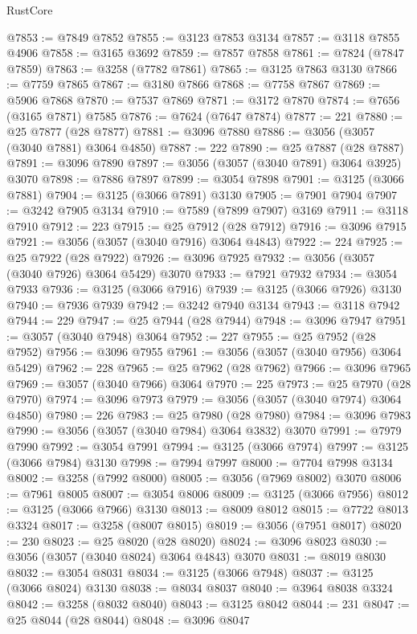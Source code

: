 \begin{lexlean}{RustCore}
\begin{coremodule}
@7853 := @7849 @7852
@7855 := @3123 @7853 @3134
@7857 := @3118 @7855 @4906
@7858 := @3165 @3692
@7859 := @7857 @7858
@7861 := @7824 (@7847 @7859)
@7863 := @3258 (@7782 @7861)
@7865 := @3125 @7863 @3130
@7866 := @7759 @7865
@7867 := @3180 @7866
@7868 := @7758 @7867
@7869 := @5906 @7868
@7870 := @7537 @7869
@7871 := @3172 @7870
@7874 := @7656 (@3165 @7871) @7585
@7876 := @7624 (@7647 @7874)
@7877 := 221
@7880 := @25 @7877 (@28 @7877)
@7881 := @3096 @7880
@7886 := @3056 (@3057 (@3040 @7881) @3064 @4850)
@7887 := 222
@7890 := @25 @7887 (@28 @7887)
@7891 := @3096 @7890
@7897 := @3056 (@3057 (@3040 @7891) @3064 @3925) @3070
@7898 := @7886 @7897
@7899 := @3054 @7898
@7901 := @3125 (@3066 @7881)
@7904 := @3125 (@3066 @7891) @3130
@7905 := @7901 @7904
@7907 := @3242 @7905 @3134
@7910 := @7589 (@7899 @7907) @3169
@7911 := @3118 @7910
@7912 := 223
@7915 := @25 @7912 (@28 @7912)
@7916 := @3096 @7915
@7921 := @3056 (@3057 (@3040 @7916) @3064 @4843)
@7922 := 224
@7925 := @25 @7922 (@28 @7922)
@7926 := @3096 @7925
@7932 := @3056 (@3057 (@3040 @7926) @3064 @5429) @3070
@7933 := @7921 @7932
@7934 := @3054 @7933
@7936 := @3125 (@3066 @7916)
@7939 := @3125 (@3066 @7926) @3130
@7940 := @7936 @7939
@7942 := @3242 @7940 @3134
@7943 := @3118 @7942
@7944 := 229
@7947 := @25 @7944 (@28 @7944)
@7948 := @3096 @7947
@7951 := @3057 (@3040 @7948) @3064
@7952 := 227
@7955 := @25 @7952 (@28 @7952)
@7956 := @3096 @7955
@7961 := @3056 (@3057 (@3040 @7956) @3064 @5429)
@7962 := 228
@7965 := @25 @7962 (@28 @7962)
@7966 := @3096 @7965
@7969 := @3057 (@3040 @7966) @3064
@7970 := 225
@7973 := @25 @7970 (@28 @7970)
@7974 := @3096 @7973
@7979 := @3056 (@3057 (@3040 @7974) @3064 @4850)
@7980 := 226
@7983 := @25 @7980 (@28 @7980)
@7984 := @3096 @7983
@7990 := @3056 (@3057 (@3040 @7984) @3064 @3832) @3070
@7991 := @7979 @7990
@7992 := @3054 @7991
@7994 := @3125 (@3066 @7974)
@7997 := @3125 (@3066 @7984) @3130
@7998 := @7994 @7997
@8000 := @7704 @7998 @3134
@8002 := @3258 (@7992 @8000)
@8005 := @3056 (@7969 @8002) @3070
@8006 := @7961 @8005
@8007 := @3054 @8006
@8009 := @3125 (@3066 @7956)
@8012 := @3125 (@3066 @7966) @3130
@8013 := @8009 @8012
@8015 := @7722 @8013 @3324
@8017 := @3258 (@8007 @8015)
@8019 := @3056 (@7951 @8017)
@8020 := 230
@8023 := @25 @8020 (@28 @8020)
@8024 := @3096 @8023
@8030 := @3056 (@3057 (@3040 @8024) @3064 @4843) @3070
@8031 := @8019 @8030
@8032 := @3054 @8031
@8034 := @3125 (@3066 @7948)
@8037 := @3125 (@3066 @8024) @3130
@8038 := @8034 @8037
@8040 := @3964 @8038 @3324
@8042 := @3258 (@8032 @8040)
@8043 := @3125 @8042
@8044 := 231
@8047 := @25 @8044 (@28 @8044)
@8048 := @3096 @8047

\end{coremodule}
\end{lexlean}
